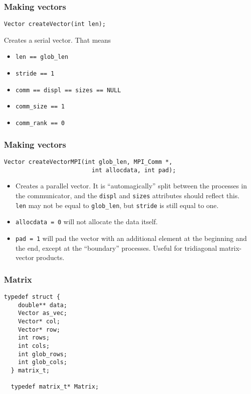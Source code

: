 \begin{frame}[fragile]
  \frametitle{Making vectors}
\begin{lstlisting}[style=c]
  Vector createVector(int len);
\end{lstlisting}
  Creates a serial vector. That means
  \begin{itemize}
  \item \texttt{len == glob\_len}
  \item \texttt{stride == 1}
  \item \texttt{comm == displ == sizes == NULL}
  \item \texttt{comm\_size == 1}
  \item \texttt{comm\_rank == 0}
  \end{itemize}
\end{frame}

\begin{frame}[fragile]
  \frametitle{Making vectors}
\begin{lstlisting}[style=c]
  Vector createVectorMPI(int glob_len, MPI_Comm *,
                         int allocdata, int pad);
\end{lstlisting}
  \begin{itemize}
  \item Creates a parallel vector. It is ``automagically'' split between the
    processes in the communicator, and the \texttt{displ} and \texttt{sizes}
    attributes should reflect this. \texttt{len} may not be equal to
    \texttt{glob\_len}, but \texttt{stride} is still equal to one.
  \item \texttt{allocdata = 0} will not allocate the data itself.
  \item \texttt{pad = 1} will pad the vector with an additional element at the
    beginning and the end, except at the ``boundary'' processes. Useful for
    tridiagonal matrix-vector products.
  \end{itemize}
\end{frame}

\begin{frame}[fragile]
  \frametitle{Matrix}
\begin{lstlisting}[style=c]
  typedef struct {
    double** data;
    Vector as_vec;
    Vector* col;
    Vector* row;
    int rows;
    int cols;
    int glob_rows;
    int glob_cols;
  } matrix_t;

  typedef matrix_t* Matrix;
\end{lstlisting}
\end{frame}

